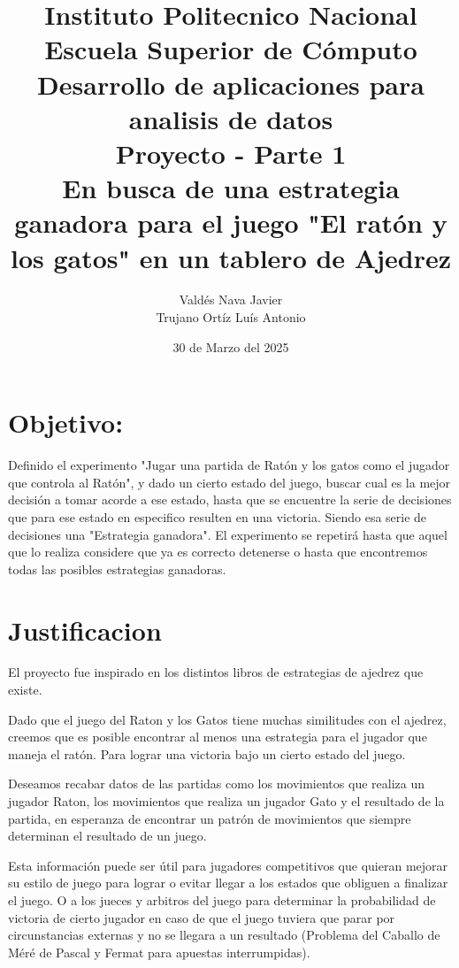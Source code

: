 \documentclass[12pt, Tahoma]{article}
\begin{document}
	\title{
		Instituto Politecnico Nacional\\
		Escuela Superior de Cómputo\\
		Desarrollo de aplicaciones para analisis de datos\\
		\vspace{1cm}
			\textbf{Proyecto - Parte 1}\\
			\textbf{En busca de una estrategia ganadora para el juego "El ratón y los gatos" en un tablero de Ajedrez}
	}
	\author{
		Valdés Nava Javier\\
		Trujano Ortíz Luís Antonio
	}
	\date{30 de Marzo del 2025}
	\maketitle
	\section*{Objetivo:} Definido el experimento "Jugar una partida de Ratón y los gatos como el jugador que controla al Ratón", y dado un cierto estado del juego, buscar cual es la mejor decisión a tomar acorde a ese estado, hasta que se encuentre la serie de decisiones que para ese estado en especifico resulten en una victoria. Siendo esa serie de decisiones una "Estrategia ganadora". El experimento se repetirá hasta que aquel que lo realiza considere que ya es correcto detenerse o hasta que encontremos todas las posibles estrategias ganadoras.
	\section*{Justificacion} El proyecto fue inspirado en los distintos libros de estrategias de ajedrez que existe.
	 
	Dado que el juego del Raton y los Gatos tiene muchas similitudes con el ajedrez, creemos que es posible encontrar al menos una estrategia para el jugador que maneja el ratón. Para lograr una victoria bajo un cierto estado del juego.
	
	Deseamos recabar datos de las partidas como los movimientos que realiza un jugador Raton, los movimientos que realiza un jugador Gato y el resultado de la partida, en esperanza de encontrar un patrón de movimientos que siempre determinan el resultado de un juego.
	
	Esta información puede ser útil para jugadores competitivos que quieran mejorar su estilo de juego para lograr o evitar llegar a los estados que obliguen a finalizar el juego. O a los jueces y arbitros del juego para determinar la probabilidad de victoria de cierto jugador en caso de que el juego tuviera que parar por circunstancias externas y no se llegara a un resultado (Problema del Caballo de Méré de Pascal y Fermat para apuestas interrumpidas).
	 
\end{document}
